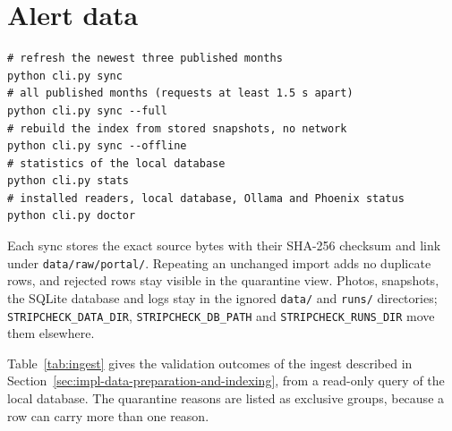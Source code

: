 \section{Alert data}
\label{sec:app-run-data}

\par\smallskip\noindent\begin{minipage}[t]{\linewidth}\vspace{-\topsep}\begin{lstlisting}[language={},numbers=none,breakatwhitespace=true]
# refresh the newest three published months
python cli.py sync
# all published months (requests at least 1.5 s apart)
python cli.py sync --full
# rebuild the index from stored snapshots, no network
python cli.py sync --offline
# statistics of the local database
python cli.py stats
# installed readers, local database, Ollama and Phoenix status
python cli.py doctor
\end{lstlisting}\end{minipage}\par\smallskip\noindent

Each sync stores the exact source bytes with their SHA-256 checksum and link under \texttt{data/raw/portal/}. Repeating an unchanged import adds no duplicate rows, and rejected rows stay visible in the quarantine view. Photos, snapshots, the SQLite database and logs stay in the ignored \texttt{data/} and \texttt{runs/} directories; \texttt{STRIPCHECK\_DATA\_DIR}, \texttt{STRIPCHECK\_DB\_PATH} and \texttt{STRIPCHECK\_RUNS\_DIR} move them elsewhere.

Table~\ref{tab:ingest} gives the validation outcomes of the ingest described in
Section~\ref{sec:impl-data-preparation-and-indexing}, from a read-only query of the local database.
The quarantine reasons are listed as exclusive groups, because a row can carry more than one reason.

